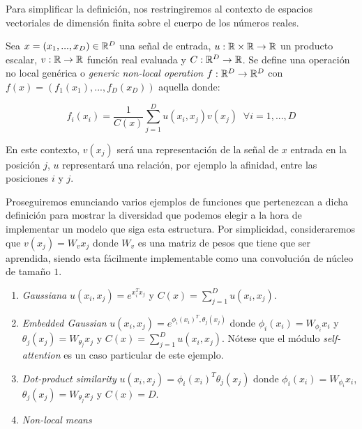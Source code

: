Para simplificar la definición, nos restringiremos al contexto de espacios vectoriales de dimensión finita sobre el cuerpo de los números reales.
\begin{definicion}
 Sea $x=(x_1,...,x_D)\in \mathbb{R}^D$ una señal de entrada, $u:\mathbb{R} \times \mathbb{R} \to \mathbb{R}$ un producto escalar, $v:\mathbb{R} \to \mathbb{R}$ función real evaluada y $C:\mathbb{R}^D \to \mathbb{R}$.  Se define una operación no local genérica o \emph{generic non-local operation} $f:\mathbb{R}^D \to \mathbb{R}^D$ con $f(x)=(f_1(x_1),...,f_D(x_D))$ aquella donde:

 $$f_i(x_i)=\frac{1}{C(x)}\sum_{j=1}^{D} u(x_i,x_j)v(x_j) \; \;  \forall i=1,...,D$$
\end{definicion}

 En este contexto, $v(x_j)$ será una representación de la señal de $x$ entrada en la posición $j$, $u$ representará una relación, por ejemplo la afinidad, entre las posiciones $i$ y $j$. %
\newline

 Proseguiremos enunciando varios ejemplos de funciones que pertenezcan a dicha definición para mostrar la diversidad que podemos elegir a la hora de implementar un modelo que siga esta estructura. Por simplicidad, consideraremos que $v(x_j)=W_v x_j$ donde $W_v$ es una matriz de pesos que tiene que ser aprendida, siendo esta fácilmente implementable como una convolución de núcleo de tamaño $1$.

 \begin{enumerate}
 \item \emph{Gaussiana} $u(x_i,x_j)=e^{x_i^T x_j}$ y $C(x)= \sum_{j=1}^D u(x_i,x_j)$.
 \item \emph{Embedded Gaussian} $u(x_i,x_j)=e^{\phi_i(x_i)^T,\theta_j(x_j)}$ donde $\phi_i(x_i)=W_{\phi_i} x_i$ y $\theta_j(x_j)=W_{\theta_j} x_j$ y  $C(x)= \sum_{j=1}^D u(x_i,x_j)$. Nótese que el módulo \emph{self-attention} \cite{DBLP:journals/corr/VaswaniSPUJGKP17} es un caso particular de este ejemplo.
 \item \emph{Dot-product similarity} $u(x_i,x_j)=\phi_i(x_i)^T \theta_j(x_j)$ donde $\phi_i(x_i)=W_{\phi_i} x_i$, $\theta_j(x_j)=W_{\theta_j} x_j$ y $C(x)=D$.
 \item \emph{Non-local means} \cite{Buades:2005:NAI:1068508.1069066}
 \end{enumerate}

